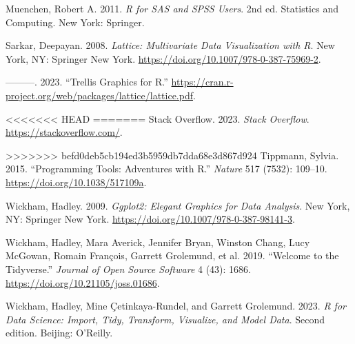 \documentclass[
  letterpaper,
]{scrbook}
\newlength{\cslhangindent}
\newlength{\cslentryspacingunit} %
\newenvironment{CSLReferences}[2] %
 {%
  \setlength{\parindent}{0pt}
  \ifodd #1
  \let\oldpar\par
  \def\par{\hangindent=\cslhangindent\oldpar}
  \fi
  \setlength{\parskip}{#2\cslentryspacingunit}
 }%
 {}
\begin{document}
\begin{CSLReferences}{1}{0}
\leavevmode{}%
Muenchen, Robert A. 2011. \emph{R for {SAS} and {SPSS} Users}. 2nd ed.
Statistics and Computing. {New York}: {Springer}.

\leavevmode{}%
Sarkar, Deepayan. 2008. \emph{Lattice: {Multivariate Data Visualization}
with {R}}. {New York, NY}: {Springer New York}.
\url{https://doi.org/10.1007/978-0-387-75969-2}.

\leavevmode{}%
---------. 2023. {``Trellis {Graphics} for {R}.''}
\url{https://cran.r-project.org/web/packages/lattice/lattice.pdf}.

<<<<<<< HEAD
=======
\leavevmode{}%
Stack Overflow. 2023. \emph{Stack {Overflow}}.
\url{https://stackoverflow.com/}.

>>>>>>> befd0deb5cb194ed3b5959db7dda68e3d867d924
\leavevmode{}%
Tippmann, Sylvia. 2015. {``Programming Tools: {Adventures} with {R}.''}
\emph{Nature} 517 (7532): 109--10.
\url{https://doi.org/10.1038/517109a}.

\leavevmode{}%
Wickham, Hadley. 2009. \emph{Ggplot2: {Elegant Graphics} for {Data
Analysis}}. {New York, NY}: {Springer New York}.
\url{https://doi.org/10.1007/978-0-387-98141-3}.

\leavevmode{}%
Wickham, Hadley, Mara Averick, Jennifer Bryan, Winston Chang, Lucy
McGowan, Romain François, Garrett Grolemund, et al. 2019. {``Welcome to
the {Tidyverse}.''} \emph{Journal of Open Source Software} 4 (43): 1686.
\url{https://doi.org/10.21105/joss.01686}.

\leavevmode{}%
Wickham, Hadley, Mine Çetinkaya-Rundel, and Garrett Grolemund. 2023.
\emph{R for Data Science: Import, Tidy, Transform, Visualize, and Model
Data}. Second edition. {Beijing}: {O'Reilly}.

\end{CSLReferences}


\backmatter
\end{document}
